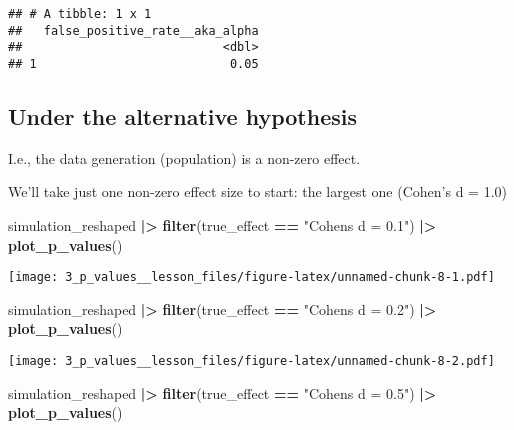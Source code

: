 \documentclass[
]{article}
\newenvironment{Shaded}{\begin{snugshade}}{\end{snugshade}}
\newcommand{\FunctionTok}[1]{\textcolor[rgb]{0.13,0.29,0.53}{\textbf{#1}}}
\newcommand{\NormalTok}[1]{#1}
\newcommand{\SpecialCharTok}[1]{\textcolor[rgb]{0.81,0.36,0.00}{\textbf{#1}}}
\newcommand{\StringTok}[1]{\textcolor[rgb]{0.31,0.60,0.02}{#1}}
\begin{document}
\begin{verbatim}
## # A tibble: 1 x 1
##   false_positive_rate__aka_alpha
##                            <dbl>
## 1                           0.05
\end{verbatim}

\hypertarget{under-the-alternative-hypothesis}{%
\subsection{Under the alternative
hypothesis}\label{under-the-alternative-hypothesis}}

I.e., the data generation (population) is a non-zero effect.

We'll take just one non-zero effect size to start: the largest one
(Cohen's d = 1.0)

\begin{Shaded}
\begin{Highlighting}[]
\NormalTok{simulation\_reshaped }\SpecialCharTok{|\textgreater{}}
  \FunctionTok{filter}\NormalTok{(true\_effect }\SpecialCharTok{==} \StringTok{"Cohen\textquotesingle{}s d = 0.1"}\NormalTok{) }\SpecialCharTok{|\textgreater{}}
  \FunctionTok{plot\_p\_values}\NormalTok{()}
\end{Highlighting}
\end{Shaded}

\texttt{[image: 3\_p\_values\_\_lesson\_files/figure-latex/unnamed-chunk-8-1.pdf]}

\begin{Shaded}
\begin{Highlighting}[]
\NormalTok{simulation\_reshaped }\SpecialCharTok{|\textgreater{}}
  \FunctionTok{filter}\NormalTok{(true\_effect }\SpecialCharTok{==} \StringTok{"Cohen\textquotesingle{}s d = 0.2"}\NormalTok{) }\SpecialCharTok{|\textgreater{}}
  \FunctionTok{plot\_p\_values}\NormalTok{()}
\end{Highlighting}
\end{Shaded}

\texttt{[image: 3\_p\_values\_\_lesson\_files/figure-latex/unnamed-chunk-8-2.pdf]}

\begin{Shaded}
\begin{Highlighting}[]
\NormalTok{simulation\_reshaped }\SpecialCharTok{|\textgreater{}}
  \FunctionTok{filter}\NormalTok{(true\_effect }\SpecialCharTok{==} \StringTok{"Cohen\textquotesingle{}s d = 0.5"}\NormalTok{) }\SpecialCharTok{|\textgreater{}}
  \FunctionTok{plot\_p\_values}\NormalTok{()}
\end{Highlighting}
\end{Shaded}
\end{document}
